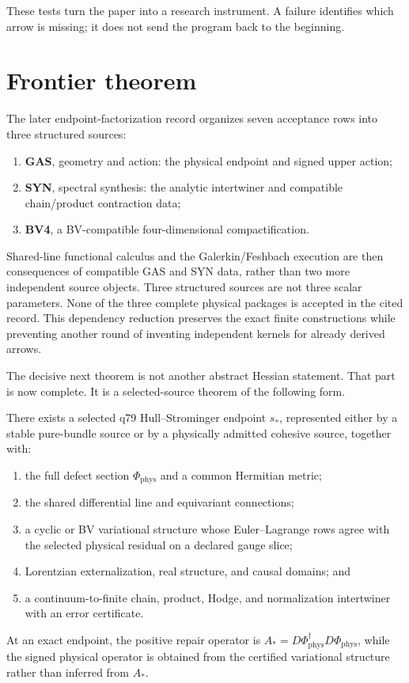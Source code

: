 \documentclass[11pt,a4paper]{article}
\begin{document}
These tests turn the paper into a research instrument.  A failure identifies
which arrow is missing; it does not send the program back to the beginning.

\section{Frontier theorem}
\label{sec:frontier}

The later endpoint-factorization record organizes seven acceptance rows
into three structured sources:
\begin{enumerate}
\item \textbf{GAS}, geometry and action: the physical endpoint and signed
upper action;
\item \textbf{SYN}, spectral synthesis: the analytic intertwiner and
compatible chain/product contraction data;
\item \textbf{BV4}, a BV-compatible four-dimensional compactification.
\end{enumerate}
Shared-line functional calculus and the Galerkin/Feshbach execution are
then consequences of compatible GAS and SYN data, rather than two more
independent source objects. Three structured sources are not three scalar
parameters. None of the three complete physical packages is accepted
in the cited record. This dependency reduction preserves the exact
finite constructions while preventing another round of inventing
independent kernels for already derived arrows.

The decisive next theorem is not another abstract Hessian statement.  That
part is now complete.  It is a selected-source theorem of the following
form.

\begin{conjecture}
There exists a selected q79 Hull--Strominger endpoint \(s_*\), represented
either by a stable pure-bundle source or by a physically admitted cohesive
source, together with:
\begin{enumerate}
\item the full defect section \(\Phi_{\mathrm{phys}}\) and a common Hermitian
metric;
\item the shared differential line and equivariant connections;
\item a cyclic or BV variational structure whose Euler--Lagrange rows agree
with the selected physical residual on a declared gauge slice;
\item Lorentzian externalization, real structure, and causal domains; and
\item a continuum-to-finite chain, product, Hodge, and normalization
intertwiner with an error certificate.
\end{enumerate}
At an exact endpoint, the positive repair operator is
\(A_*=D\Phi_{\mathrm{phys}}^{\dagger}D\Phi_{\mathrm{phys}}\), while the
signed physical operator is obtained from the certified variational
structure rather than inferred from \(A_*\).
\end{conjecture}
\end{document}
